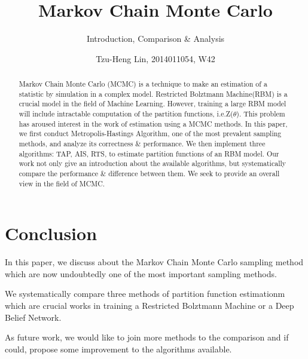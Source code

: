 \documentclass{sig-alternate-05-2015}
\begin{document}
\title{Markov Chain Monte Carlo}
\subtitle{Introduction, Comparison \& Analysis}
\author{
    \alignauthor Tzu-Heng Lin, 2014011054, W42\\
}


\maketitle
\begin{abstract}
Markov Chain Monte Carlo (MCMC) is a technique to make an estimation of a statistic by simulation in a complex model. Restricted Bolztmann Machine(RBM) is a crucial model in the field of Machine Learning. However, training a large RBM model will include intractable computation of the partition functions, i.e.Z($\theta$). This problem has aroused interest in the work of estimation using a MCMC methods.
In this paper, we first conduct Metropolis-Hastings Algorithm, one of the most prevalent sampling methods, and analyze its correctness \& performance. We then implement three algorithms: TAP, AIS, RTS, to estimate partition functions of an RBM model. Our work not only give an introduction about the available algorithms, but systematically compare the performance \& difference between them. We seek to provide an overall view in the field of MCMC.
\end{abstract}




%
%
\printccsdesc



\newpage

\newpage





\newpage
\section{Conclusion} \label{sec:conclusion}
In this paper, we discuss about the Markov Chain Monte Carlo sampling method which are now undoubtedly one of the most important sampling methods. 

We systematically compare three methods of partition function estimationm which are crucial works in training a Restricted Bolztmann Machine or a Deep Belief Network. 

As future work, we would like to join more methods to the comparison and if could, propose some improvement to the algorithms available.
\end{document}
